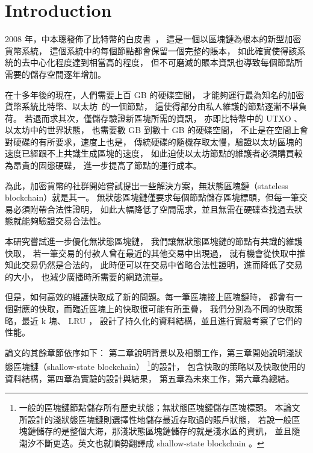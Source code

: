\chapter{Introduction}
\label{c:intro}

2008 年，中本聰發佈了比特幣的白皮書~\cite{nakamoto2019bitcoin}，
這是一個以區塊鏈為根本的新型加密貨幣系統，
這個系統中的每個節點都會保留一個完整的賬本，
如此確實使得該系統的去中心化程度達到相當高的程度，
但不可磨滅的賬本資訊也導致每個節點所需要的儲存空間逐年增加。

在十多年後的現在，人們需要上百 GB 的硬碟空間，
才能夠運行最為知名的加密貨幣系統比特幣、以太坊~\cite{wood2014ethereum}的一個節點，
這使得部分由私人維護的節點逐漸不堪負荷。
若退而求其次，僅儲存驗證新區塊所需的資訊，
亦即比特幣中的 UTXO 、以太坊中的世界狀態，
也需要數 GB 到數十 GB 的硬碟空間，
不止是在空間上會對硬碟的有所要求，速度上也是，
傳統硬碟的隨機存取太慢，驗證以太坊區塊的速度已經跟不上共識生成區塊的速度，
如此迫使以太坊節點的維護者必須購買較為昂貴的固態硬碟，
進一步提高了節點的運行成本。

為此，加密貨幣的社群開始嘗試提出一些解決方案，無狀態區塊鏈（stateless blockchain）就是其一。
無狀態區塊鏈僅要求每個節點儲存區塊標頭，但每一筆交易必須附帶合法性證明，
如此大幅降低了空間需求，並且無需在硬碟查找過去狀態就能夠驗證交易合法性。

本研究嘗試進一步優化無狀態區塊鏈，
我們讓無狀態區塊鏈的節點有共識的維護快取，
若一筆交易的付款人曾在最近的其他交易中出現過，
就有機會從快取中推知此交易仍然是合法的，
此時便可以在交易中省略合法性證明，進而降低了交易的大小，
也減少廣播時所需要的網路流量。

但是，如何高效的維護快取成了新的問題。每一筆區塊接上區塊鏈時，
都會有一個對應的快取，而臨近區塊上的快取很可能有所重疊，
我們分別為不同的快取策略，最近 k 塊、 LRU ，
設計了持久化的資料結構，並且進行實驗考察了它們的性能。

論文的其餘章節依序如下：
第二章說明背景以及相關工作，第三章開始說明淺狀態區塊鏈（shallow-state blockchain）
\footnote{一般的區塊鏈節點儲存所有歷史狀態；無狀態區塊鏈儲存區塊標頭。
本論文所設計的淺狀態區塊鏈則選擇性地儲存最近存取過的賬戶狀態，
若說一般區塊鏈儲存的是整個大海，那淺狀態區塊鏈儲存的就是淺水區的資訊，
並且隨潮汐不斷更迭。英文也就順勢翻譯成 shallow-state blockchain 。}的設計，
包含快取的策略以及快取使用的資料結構，第四章為實驗的設計與結果，
第五章為未來工作，第六章為總結。